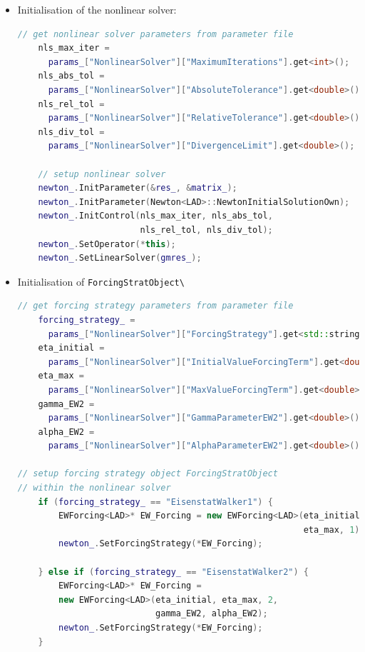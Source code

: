 \documentclass[a4paper, 11pt, twoside]{article}
\begin{document}
\begin{itemize}
\item Initialisation of the nonlinear solver:
\begin{lstlisting}[language=C++, basicstyle={\footnotesize, \ttfamily}, keywordstyle=\color{blue}, numbers=none, tabsize=4]
    // get nonlinear solver parameters from parameter file
    nls_max_iter = 
      params_["NonlinearSolver"]["MaximumIterations"].get<int>();
    nls_abs_tol = 
      params_["NonlinearSolver"]["AbsoluteTolerance"].get<double>();
    nls_rel_tol = 
      params_["NonlinearSolver"]["RelativeTolerance"].get<double>();
    nls_div_tol = 
      params_["NonlinearSolver"]["DivergenceLimit"].get<double>();
    
    // setup nonlinear solver
    newton_.InitParameter(&res_, &matrix_);
    newton_.InitParameter(Newton<LAD>::NewtonInitialSolutionOwn);
    newton_.InitControl(nls_max_iter, nls_abs_tol, 
    					nls_rel_tol, nls_div_tol);
    newton_.SetOperator(*this);
    newton_.SetLinearSolver(gmres_);
\end{lstlisting}
\item Initialisation of \verb+ForcingStratObject\+
\begin{lstlisting}[language=C++, basicstyle={\footnotesize, \ttfamily}, keywordstyle=\color{blue}, numbers=none, tabsize=4]
   // get forcing strategy parameters from parameter file
    forcing_strategy_ = 
      params_["NonlinearSolver"]["ForcingStrategy"].get<std::string>();
    eta_initial = 
      params_["NonlinearSolver"]["InitialValueForcingTerm"].get<double>();
    eta_max = 
      params_["NonlinearSolver"]["MaxValueForcingTerm"].get<double>();
    gamma_EW2 = 
      params_["NonlinearSolver"]["GammaParameterEW2"].get<double>();
    alpha_EW2 = 
      params_["NonlinearSolver"]["AlphaParameterEW2"].get<double>();
    
// setup forcing strategy object ForcingStratObject 
// within the nonlinear solver
    if (forcing_strategy_ == "EisenstatWalker1") {
    	EWForcing<LAD>* EW_Forcing = new EWForcing<LAD>(eta_initial, 
    	                                                eta_max, 1);
    	newton_.SetForcingStrategy(*EW_Forcing);
    	
    } else if (forcing_strategy_ == "EisenstatWalker2") {
    	EWForcing<LAD>* EW_Forcing = 
    	new EWForcing<LAD>(eta_initial, eta_max, 2, 
    					   gamma_EW2, alpha_EW2);
    	newton_.SetForcingStrategy(*EW_Forcing);
    }
\end{lstlisting}

\end{itemize}
\end{document}
